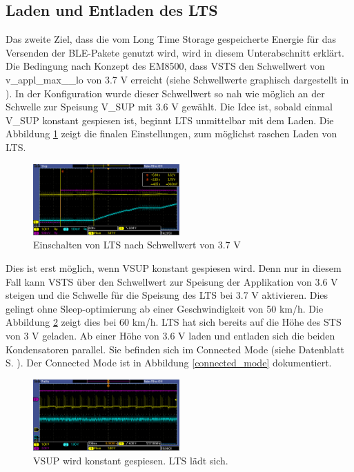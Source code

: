 \subsection{Laden und Entladen des LTS}
\label{res_entladen}

Das zweite Ziel, dass die vom Long Time Storage gespeicherte Energie für das Versenden der BLE-Pakete genutzt wird, wird in diesem Unterabschnitt erklärt. Die Bedingung nach Konzept des EM8500, dass VSTS den Schwellwert von v\_appl\_max\_\_lo von 3.7 V erreicht (siehe Schwellwerte graphisch dargestellt in ). In der Konfiguration wurde dieser Schwellwert so nah wie möglich an der Schwelle zur Speisung V\_SUP mit 3.6 V gewählt. Die Idee ist, sobald einmal V\_SUP konstant gespiesen ist, beginnt LTS unmittelbar mit dem Laden. Die Abbildung \ref{lts_ein} zeigt die finalen Einstellungen, zum  möglichst raschen Laden von LTS.

\begin{figure}[ht]
   \includegraphics[width=0.5\textwidth]{4Resultate/imag/LTS_Ladeschwelle.PNG}
    \caption{Einschalten von LTS nach Schwellwert von 3.7 V}
    \label{lts_ein}
\end{figure}

Dies ist erst möglich, wenn VSUP konstant gespiesen wird. Denn nur in diesem Fall kann VSTS über den Schwellwert zur Speisung der Applikation von 3.6 V steigen und die Schwelle für die Speisung des LTS bei 3.7 V aktivieren. Dies gelingt ohne Sleep-optimierung ab einer Geschwindigkeit von 50 km/h. Die Abbildung \ref{vsup_konstant} zeigt dies bei 60 km/h. LTS hat sich bereits auf die Höhe des STS von 3 V geladen. Ab einer Höhe von 3.6 V laden und entladen sich die beiden Kondensatoren parallel. Sie befinden sich im Connected Mode (siehe Datenblatt S. ). Der Connected Mode ist in Abbildung \ref{connected_mode} dokumentiert.

\begin{figure}[ht]
   \includegraphics[width=0.5\textwidth]{4Resultate/imag/pic_5.PNG}
    \caption{VSUP wird konstant gespiesen. LTS lädt sich.}
    \label{vsup_konstant}
\end{figure}

